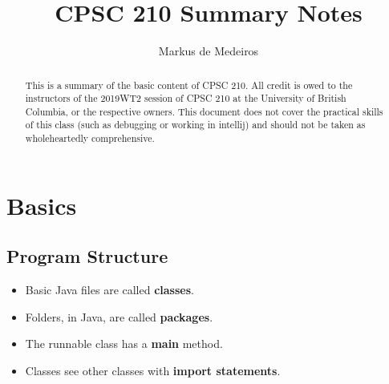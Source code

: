\documentclass[letterpaper] {article}
\begin{document}
	\title{CPSC 210 Summary Notes}
	\author{Markus de Medeiros}
	\maketitle

    \begin{abstract}
        This is a summary of the basic content of CPSC 210. All credit is owed to the instructors of the 2019WT2 session of CPSC 210 at the University of British Columbia, or the respective owners. This document does not cover the practical skills of this class (such as debugging or working in intellij) and should not be taken as wholeheartedly comprehensive. 
    \end{abstract}

    \section{Basics}

    \subsection{Program Structure}
    \begin{itemize}
        \item Basic Java files are called \textbf{classes}.
        \item Folders, in Java, are called \textbf{packages}.
        \item The runnable class has a \textbf{main} method.
        \item Classes see other classes with \textbf{import statements}. 
    \end{itemize}
\end{document}
